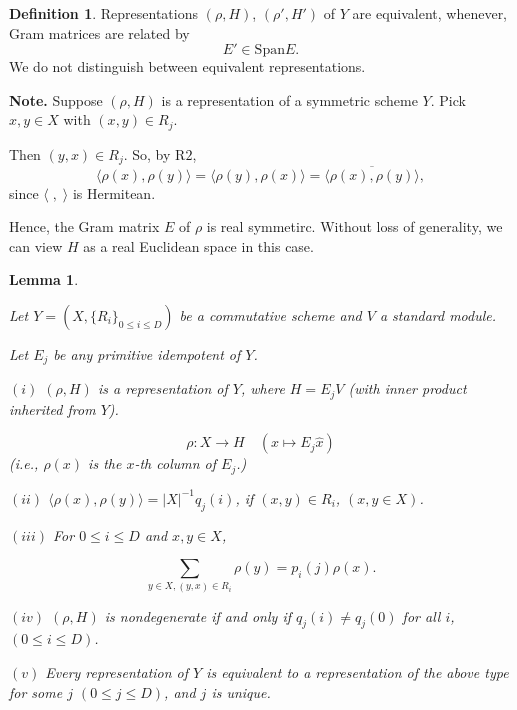 \documentclass[
]{book}
\newtheorem{lemma}{Lemma}[chapter]
\theoremstyle{definition}
\newtheorem{definition}{Definition}[chapter]
\theoremstyle{definition}
\theoremstyle{definition}
\theoremstyle{definition}
\theoremstyle{remark}
\begin{document}
\begin{definition}
\protect\hypertarget{def:equivalence-of-representation}{}\label{def:equivalence-of-representation}Representations \((\rho, H)\), \((\rho', H')\) of \(Y\) are equivalent, whenever, Gram matrices are related by
\[E'\in \mathrm{Span} E.\]
We do not distinguish between equivalent representations.
\end{definition}

\textbf{Note.}
Suppose \((\rho, H)\) is a representation of a symmetric scheme \(Y\). Pick \(x,y\in X\) with \((x,y)\in R_j\).

Then \((y,x)\in R_j\). So, by \(\mathrm{R2}\),
\[\langle \rho(x), \rho(y)\rangle = \langle \rho(y),\rho(x)\rangle = \overline{\langle \rho(x), \rho(y)\rangle},\]
since \(\langle \;, \;\rangle\) is Hermitean.

Hence, the Gram matrix \(E\) of \(\rho\) is real symmetirc. Without loss of generality, we can view \(H\) as a real Euclidean space in this case.

\begin{lemma}
\protect\hypertarget{lem:rep-of-scheme}{}\label{lem:rep-of-scheme}

Let \(Y = (X, \{R_i\}_{0\leq i\leq D})\) be a commutative scheme and \(V\) a standard module.

Let \(E_j\) be any primitive idempotent of \(Y\).

\((i)\) \((\rho, H)\) is a representation of \(Y\), where \(H = E_jV\) (with inner product inherited from \(Y\)).

\[\rho: X \to H \quad (x\mapsto E_j\hat{x})\]
(i.e., \(\rho(x)\) is the \(x\)-th column of \(E_j\).)

\((ii)\) \(\langle \rho(x),\rho(y)\rangle = |X|^{-1}q_j(i)\), if \((x,y)\in R_i\), \((x,y\in X)\).

\((iii)\) For \(0\leq i\leq D\) and \(x,y\in X\),

\[\sum_{y\in X, (y,x)\in R_i}\rho(y) = p_i(j)\rho(x).\]

\((iv)\) \((\rho,H)\) is nondegenerate if and only if \(q_j(i) \neq q_j(0)\) for all \(i\), \((0\leq i\leq D)\).

\((v)\) Every representation of \(Y\) is equivalent to a representation of the above type for some \(j\) \((0\leq j\leq D)\), and \(j\) is unique.

\end{lemma}
\end{document}
